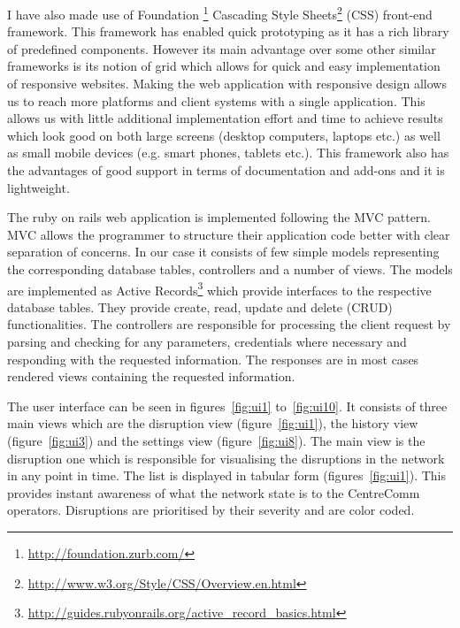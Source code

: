 I have also made use of Foundation \footnote{\url{http://foundation.zurb.com/}} Cascading Style Sheets\footnote{\url{http://www.w3.org/Style/CSS/Overview.en.html}} (CSS) front-end framework. This framework has enabled quick prototyping as it has a rich library of predefined components. However its main advantage over some other similar frameworks is its notion of grid which allows for quick and easy implementation of responsive websites. Making the web application with responsive design allows us to reach more platforms and client systems with a single application. This allows us with little additional implementation effort and time to achieve results which look good on both large screens (desktop computers, laptops etc.) as well as small mobile devices (e.g. smart phones, tablets etc.). This framework also has the advantages of good support in terms of documentation and add-ons and it is lightweight.


The ruby on rails web application is implemented following the MVC pattern. MVC allows the programmer to structure their application code better with clear separation of concerns. In our case it consists of few simple models representing the corresponding database tables, controllers and a number of views. The models are implemented as Active Records\footnote{\url{http://guides.rubyonrails.org/active_record_basics.html}} which provide interfaces to the respective database tables. They provide create, read, update and delete (CRUD) functionalities. The controllers are responsible for processing the client request by parsing and checking for any parameters, credentials where necessary and responding with the requested information. The responses are in most cases rendered views containing the requested information.

The user interface can be seen in figures~\ref{fig:ui1} to~\ref{fig:ui10}. It consists of three main views which are the disruption view (figure~\ref{fig:ui1}), the history view (figure~\ref{fig:ui3}) and the settings view (figure~\ref{fig:ui8}). The main view is the disruption one which is responsible for visualising the disruptions in the network in any point in time. The list is displayed in tabular form (figures~\ref{fig:ui1}). This provides instant awareness of what the network state is to the CentreComm operators. Disruptions are prioritised by their severity and are color coded.

